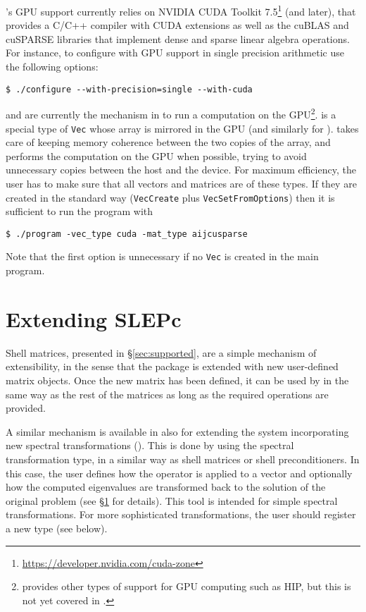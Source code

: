 \slepc's GPU support currently relies on NVIDIA CUDA Toolkit 7.5\footnote{\url{https://developer.nvidia.com/cuda-zone}} (and later), that provides a C/C++ compiler with CUDA extensions as well as the cuBLAS and cuSPARSE libraries that implement dense and sparse linear algebra operations. For instance, to configure \petsc with GPU support in single precision arithmetic use the following options:
	\begin{Verbatim}[fontsize=\small]
	$ ./configure --with-precision=single --with-cuda
	\end{Verbatim}

 and  are currently the mechanism in \petsc to run a computation on the GPU\footnote{\petsc provides other types of support for GPU computing such as HIP, but this is not yet covered in \slepc.}.  is a special type of \texttt{Vec} whose array is mirrored in the GPU (and similarly for ). \petsc takes care of keeping memory coherence between the two copies of the array, and performs the computation on the GPU when possible, trying to avoid unnecessary copies between the host and the device. For maximum efficiency, the user has to make sure that all vectors and matrices are of these types. If they are created in the standard way (\texttt{VecCreate} plus \texttt{VecSetFromOptions}) then it is sufficient to run the \slepc program with
	\begin{Verbatim}[fontsize=\small]
	$ ./program -vec_type cuda -mat_type aijcusparse
	\end{Verbatim}
Note that the first option is unnecessary if no \texttt{Vec} is created in the main program.

\section{Extending SLEPc}
\label{sec:shell}

	Shell matrices, presented in \S\ref{sec:supported}, are a simple mechanism of extensibility, in the sense that the package is extended with new user-defined matrix objects. Once the new matrix has been defined, it can be used by \slepc in the same way as the rest of the matrices as long as the required operations are provided.

	A similar mechanism is available in \slepc also for extending the system incorporating new spectral transformations (). This is done by using the  spectral transformation type, in a similar way as shell matrices or shell preconditioners. In this case, the user defines how the operator is applied to a vector and optionally how the computed eigenvalues are transformed back to the solution of the original problem (see \S\ref{sec:shell} for details). This tool is intended for simple spectral transformations. For more sophisticated transformations, the user should register a new  type (see below).

